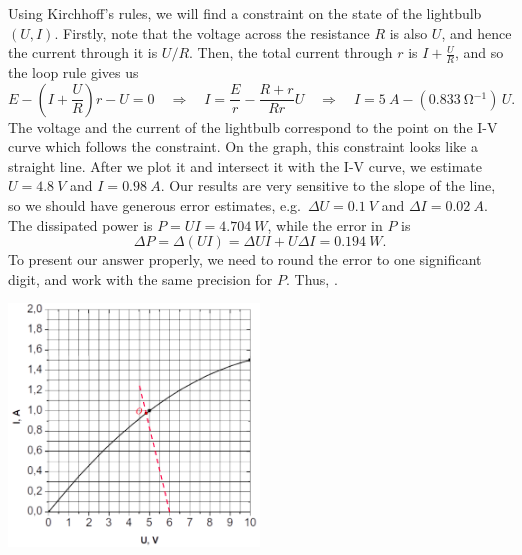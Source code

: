 \documentclass[../TST.tex]{subfiles}
\begin{document}
	\begin{solution} Using Kirchhoff's rules, we will find a constraint on the state of the lightbulb $(U,I)$. Firstly, note that the voltage across the resistance $R$ is also $U$, and hence the current through it is $U/R$. Then, the total current through $r$ is $I+\frac{U}{R}$, and so the loop rule gives us
\begin{equation*}
	E- \left(I+\frac{U}{R}\right)r-U=0 \quad\Rightarrow\quad I=\frac{E}{r}-\frac{R+r}{Rr}U \quad\Rightarrow\quad I = \qty{5}{A} - (\qty{0.833}{\ohm^{-1}})\,U 
.
\end{equation*}
The voltage and the current of the lightbulb correspond to the point on the I-V curve which follows the constraint. On the graph, this constraint looks like a straight line. After we plot it and intersect it with the I-V curve, we estimate $U=\qty{4.8}{V}$ and $I=\qty{0.98}{A}$. Our results are very sensitive to the slope of the line, so we should have generous error estimates, e.g.\, $\Delta U=\qty{0.1}{V}$ and $\Delta I = \qty{0.02}{A}$. The dissipated power is $P=UI=\qty{4.704}{W}$, while the error in $P$ is
\begin{equation*}
\Delta P = \Delta (UI) = \Delta U I + U\Delta I= \qty{0.194}{W}
.
\end{equation*}
To present our answer properly, we need to round the error to one significant digit, and work with the same precision for $P$. Thus, .

\begin{center}
\hspace{-2em}
\includegraphics[width=0.5\textwidth]{fig/a2007_s4.png}
\end{center}

\end{solution}
\fi
\end{document}
